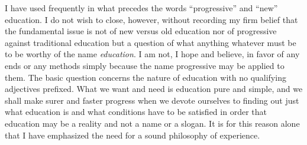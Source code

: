 I have used frequently in what precedes the words \enquote{progressive} and \enquote{new} education. 
I do not wish to close, however, without recording my firm belief that the fundamental 
issue is not of new versus old education nor of progressive against traditional education 
but a question of what anything whatever must be to be worthy of the name \textit{education}. I 
am not, I hope and believe, in favor of any ends or any methods simply because the name 
progressive may be applied to them. The basic question concerns the nature of education 
with no qualifying adjectives prefixed. What we want and need is education pure and 
simple, and we shall make surer and faster progress when we devote ourselves to finding 
out just what education is and what conditions have to be satisfied in order that education 
may be a reality and not a name or a slogan. It is for this reason alone that I have 
emphasized the need for a sound philosophy of experience. 
